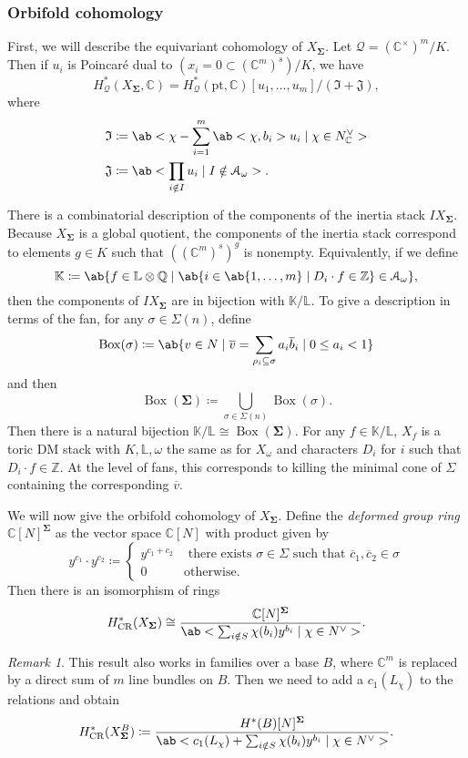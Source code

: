 \documentclass[leqno, openany]{memoir}
\theoremstyle{definition}
\theoremstyle{remark}
\newtheorem{rmk}[thm]{Remark}
\theoremstyle{plain}
\theoremstyle{definition}
\theoremstyle{remark}
\newcommand{\C}{\mathbb{C}}
\newcommand{\Z}{\mathbb{Z}}
\newcommand{\Q}{\mathbb{Q}}
\renewcommand{\L}{\mathbb{L}}
\newcommand{\mc}[1]{\mathcal{#1}}
\newcommand{\mf}[1]{\mathfrak{#1}}
\newcommand{\mr}[1]{\mathrm{#1}}
\newcommand{\on}[1]{\operatorname{#1}}
\newcommand{\ol}[1]{\overline{#1}}
\begin{document}
\subsubsection{Orbifold cohomology}%
\label{ssub:Orbifold cohomology}

First, we will describe the equivariant cohomology of $X_{\bm{\Sigma}}$. Let $\mc{Q} = (\C^{\times})^m/K$. Then if $u_i$ is Poincar\'e dual to $(x_i = 0 \subset (\C^m)^s)/K$, we have
\[ H_{\mc{Q}}^*(X_{\bm{\Sigma}}, \C) = H_{\mc{Q}}^*(\mr{pt}, \C) [u_1, \ldots, u_m] / (\mf{I} + \mf{J}), \]
where
\begin{align*}
    \mf{I} &\coloneqq \ab< \chi - \sum_{i=1}^m \ab<\chi, b_i>u_i \mid \chi \in N^{\vee}_{\C}> \\
    \mf{J} &\coloneqq \ab<\prod_{i \notin I} u_i \mid I \notin \mc{A}_{\omega}>.
\end{align*}

There is a combinatorial description of the components of the inertia stack $IX_{\bm{\Sigma}}$. Because $X_{\bm{\Sigma}}$ is a global quotient, the components of the inertia stack correspond to elements $g \in K$ such that $( (\C^m)^s )^g$ is nonempty. Equivalently, if we define
\[ \mathbb{K} \coloneqq \ab\{f \in \L \otimes \Q \mid \ab\{ i \in \ab\{1,\ldots,m\} \mid D_i \cdot f \in \Z\} \in \mc{A}_{\omega}\}, \]
then the components of $IX_{\bm{\Sigma}}$ are in bijection with $\mathbb{K}/\L$. To give a description in terms of the fan, for any $\sigma \in \Sigma(n)$, define
\[ \on{Box}(\sigma) \coloneqq \ab\{v \in N \mid \ol{v} = \sum_{\rho_i \subseteq \sigma} a_i \ol{b}_i \mid 0 \leq a_i < 1\}\]
and then
\[ \on{Box}(\bm{\Sigma}) \coloneqq \bigcup_{\sigma \in \Sigma(n)} \on{Box}(\sigma). \]
Then there is a natural bijection $\mathbb{K}/\L \cong \on{Box}(\bm{\Sigma})$. For any $f \in \mathbb{K}/\L$, $X_f$ is a toric DM stack with $K, \L, \omega$ the same as for $X_{\omega}$ and characters $D_i$ for $i$ such that $D_i \cdot f \in \Z$. At the level of fans, this corresponds to killing the minimal cone of $\Sigma$ containing the corresponding $\ol{v}$.

We will now give the orbifold cohomology of $X_{\bm{\Sigma}}$. Define the \textit{deformed group ring} $\C[N]^{\bm{\Sigma}}$ as the vector space $\C[N]$ with product given by
\[ y^{c_1} \cdot y^{c_2} \coloneqq \begin{cases}
    y^{c_1 + c_2} & \text{ there exists } \sigma \in \Sigma \text{ such that } \ol{c}_1, \ol{c}_2 \in \sigma \\
    0 & \text{otherwise}.
\end{cases}
\]
Then there is an isomorphism of rings
\[ H^*_{\mr{CR}}(X_{\bm{\Sigma}}) \cong \frac{\C[N]^{\bm{\Sigma}}}{\ab<\sum_{i \notin S} \chi(b_i) y^{b_i} \mid \chi \in N^{\vee}>}. \]
\begin{rmk}
    This result also works in families over a base $B$, where $\C^m$ is replaced by a direct sum of $m$ line bundles on $B$. Then we need to add a $c_1(L_{\chi})$ to the relations and obtain
    \[ H^*_{\mr{CR}}(X^B_{\bm{\Sigma}}) \coloneqq \frac{H^*(B)[N]^{\bm{\Sigma}}}{\ab<c_1(L_{\chi}) + \sum_{i \notin S} \chi(b_i) y^{b_i} \mid \chi \in N^{\vee}>}. \]
\end{rmk}
\end{document}
